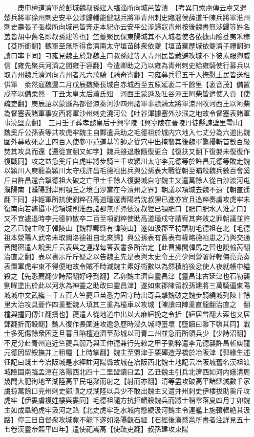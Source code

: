 　　庚申檀道濟軍於彭城魏叔孫建入臨淄所向城邑皆潰　【考異曰索虜傳云虜又遣楚兵將軍徐州刺史安平公涉歸幡能健越兵將軍青州刺史臨淄侯薛道千陳兵將軍淮州刺史夀張子張模所向城邑皆奔走本紀亦云安平公涉歸寇青州按後魏書無涉歸等姓名盖皆胡中舊名即叔孫建等也】竺夔聚民保東陽城其不入城者使各依據山險芟夷禾稼【芟所銜翻】魏軍至無所得食濟南太守垣苗帥衆依夔【垣苗棄歷城依夔濟子禮翻帥讀曰率下同】刁雍見魏主於鄴魏主曰叔孫建等入青州民皆藏避攻城不下彼素服卿威信【雍先聚兵河濟之間雍于容翻】今遣卿助之乃以雍為青州刺史給雍騎使行募兵以取青州魏兵濟河向青州者凡六萬騎【騎奇寄翻】刁雍募兵得五千人撫慰土民皆送租供軍　柔然寇魏邊二月戊辰魏築長城自赤城西至五原延袤二千餘里【袤音茂】備置戍卒以備柔然　丁丑太皇太后蕭氏殂　河西王蒙遜及吐谷渾王阿柴皆遣使入貢【使疏吏翻】庚辰詔以蒙遜為都督涼秦河沙四州諸軍事驃騎太將軍涼州牧河西王以阿柴為督塞表諸軍事安西將軍沙州刺史澆河公【吐谷渾據塞外沙漒之地故令督塞表諸軍事澆堅堯翻】　三月壬子葬孝懿皇后于興寜陵【興寜陵在晉陵丹徒縣諫壁里雩山】　魏奚斤公孫表等共攻虎牢魏主自鄴遣兵助之毛德祖於城内穴地入七丈分為六道出魏圍外募敢死之士四百人使參軍范道基等帥之從穴中出掩襲其後魏軍驚擾斬首數百級焚其攻具而還【還從宣翻又如字】魏兵雖退散隨復更合【復扶又翻下復嬰未復復作復戰同】攻之益急奚斤自虎牢將步騎三千攻潁川太守李元德等於許昌元德等敗走魏以潁川人庾龍為潁川太守戍許昌毛德祖出兵與公孫表大戰從朝至晡殺魏兵數百會奚斤自許昌還合撃德祖大破之亡甲士千餘人復嬰城自守魏主又遣萬餘人從白沙渡河屯濮陽南【濮陽對岸則頓丘之境白沙當在今澶州之界】朝議以項城去魏不遠【朝直遥翻下同】非輕軍所抗使劉粹召高道瑾還夀陽若沈叔狸已進亦宜且追粹奏虜攻虎牢未復南向若遽攝軍捨項城則淮西諸郡無所凴依沈叔狸已頓肥口【肥口肥水入淮之口】又不宜遽退時李元德帥散卒二百至項劉粹使助高道瑾戍守請宥其奔敗之罪朝議並許之乙已魏主畋于韓陵山【魏郡鄴縣有韓陵山】遂如汲郡至枋頭初毛德祖在北【毛德祖本滎陽人武帝未取關洛德祖自北來歸】與公孫表有舊表有權略德祖患之乃與交通音問密遣人說奚斤云表與之連謀每答表書多所治定【此曹操間韓馬之智也說輸芮翻治直之翻】表以書示斤斤疑之以告魏主先是表與太史令王亮少同營署好輕侮亮亮奏表置軍虎牢東不得便地故令賊不時滅魏主素好術數以為然積前後忿使人夜就帳中縊殺之【先悉薦翻少詩照翻好呼到翻】乙卯魏主濟自靈昌津【靈昌津古延津也石勒襲劉曜塗出於此以河氷為神靈之助改曰靈昌津】遂如東郡陳留叔孫建將三萬騎逼東陽城城中文武纔一千五百人竺夔垣苗悉力固守時出奇兵擊魏破之魏步騎繞城列陳十餘里大治攻具夔作四重塹魏人填其三重為橦車以攻城【陳讀曰陣重直龍翻治直之　翻橦與撞同傳江翻擣也】夔遣人從地道中出以大麻絙挽之令折【絙居曾翻大索也又居鄧翻折而設翻】魏人復作長圍進攻逾急歷時浸久城轉墮壞【墮讀曰隳下隳其同】戰士多死傷餘衆困乏旦暮且陷檀道濟至彭城以司青二州並急而所領兵少【少詩沼翻】不足分赴青州道近竺夔兵弱乃與王仲德兼行先敕之甲子劉粹遣李元德襲許昌斬庾龍元德因留綏撫并上租糧【上時掌翻】魏主至盟津于栗磾造浮橋於冶阪津【郭緣生述征記曰踐土今冶阪城是水經註河陽縣故城在冶阪西北魏土地記云冶阪城舊名漢祖渡城險固南臨孟津在洛陽西北四十二里盟讀曰孟】乙丑魏主引兵北濟西如河内娥清周幾閭大肥徇地至湖陸高平民屯聚而射之【射而亦翻】清等盡攻破高平諸縣滅數千家虜掠萬餘口兖州刺史鄭順之戍湖陸以兵少不敢出魏主又遣并州刺史伊樓拔助奚斤攻虎牢【伊婁虜複姓樓與婁同】毛德祖隨方抗拒頗殺魏兵而將士稍零落夏四月丁卯魏主如成臯絶虎牢汲河之路【北史虎牢乏水城内懸綆汲河魏主令連艦上施轒輼絶其汲路】停三日自督衆攻城竟不能下遂如洛陽觀石經【石經後漢蔡邕所書者注詳見五十七卷漢靈帝熙平四年】遣使祀嵩高【使疏吏翻】叔孫建攻東陽